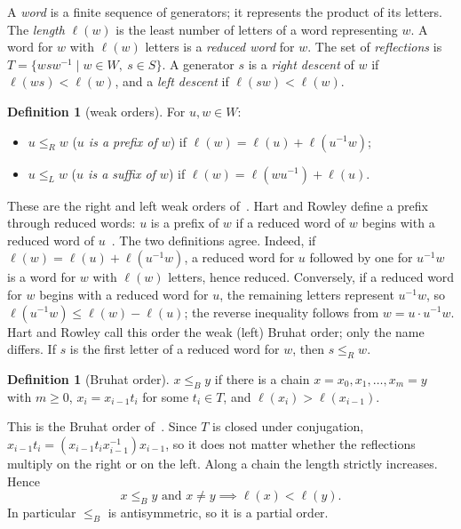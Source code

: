 \documentclass[11pt]{amsart}
\theoremstyle{definition}
\newtheorem{definition}[theorem]{Definition}
\theoremstyle{remark}
\numberwithin{equation}{section}
\newcommand{\leR}{\le_R}
\newcommand{\leL}{\le_L}
\newcommand{\leB}{\le_B}
\begin{document}
A \emph{word} is a finite sequence of generators; it represents the product of its letters. The \emph{length} \(\ell(w)\) is the least number of letters of a word representing \(w\). A word for \(w\) with \(\ell(w)\) letters is a \emph{reduced word} for \(w\). The set of \emph{reflections} is \(T=\{wsw^{-1}\mid w\in W,\ s\in S\}\). A generator \(s\) is a \emph{right descent} of \(w\) if \(\ell(ws)<\ell(w)\), and a \emph{left descent} if \(\ell(sw)<\ell(w)\).

\begin{definition}[weak orders]\label{def:weak}
For \(u,w\in W\):
\begin{itemize}
\item \(u\leR w\) (\emph{\(u\) is a prefix of \(w\)}) if \(\ell(w)=\ell(u)+\ell(u^{-1}w)\);
\item \(u\leL w\) (\emph{\(u\) is a suffix of \(w\)}) if \(\ell(w)=\ell(wu^{-1})+\ell(u)\).
\end{itemize}
\end{definition}

These are the right and left weak orders of~\cite[Ch.~3]{BB}. Hart and Rowley define a prefix through reduced words: \(u\) is a prefix of \(w\) if a reduced word of \(w\) begins with a reduced word of \(u\)~\cite{HR}. The two definitions agree. Indeed, if \(\ell(w)=\ell(u)+\ell(u^{-1}w)\), a reduced word for \(u\) followed by one for \(u^{-1}w\) is a word for \(w\) with \(\ell(w)\) letters, hence reduced. Conversely, if a reduced word for \(w\) begins with a reduced word for \(u\), the remaining letters represent \(u^{-1}w\), so \(\ell(u^{-1}w)\le\ell(w)-\ell(u)\); the reverse inequality follows from \(w=u\cdot u^{-1}w\). Hart and Rowley call this order the weak (left) Bruhat order; only the name differs. If \(s\) is the first letter of a reduced word for \(w\), then \(s\leR w\).

\begin{definition}[Bruhat order]\label{def:bruhat}
\(x\leB y\) if there is a chain \(x=x_0,x_1,\dots,x_m=y\) with \(m\ge0\), \(x_i=x_{i-1}t_i\) for some \(t_i\in T\), and \(\ell(x_i)>\ell(x_{i-1})\).
\end{definition}

This is the Bruhat order of~\cite[Ch.~2]{BB}. Since \(T\) is closed under conjugation, \(x_{i-1}t_i=(x_{i-1}t_ix_{i-1}^{-1})x_{i-1}\), so it does not matter whether the reflections multiply on the right or on the left. Along a chain the length strictly increases. Hence
\begin{equation}\label{eq:I2}
x\leB y \text{ and } x\neq y \implies \ell(x)<\ell(y).
\end{equation}
In particular \(\leB\) is antisymmetric, so it is a partial order.
\end{document}
